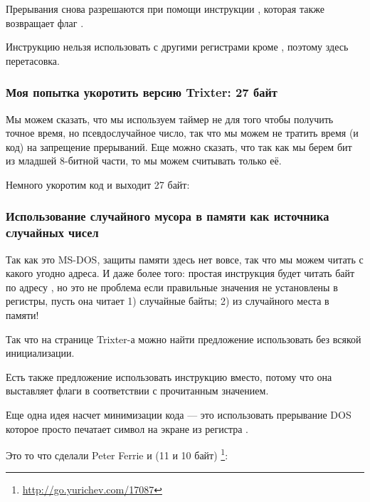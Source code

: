 Прерывания снова разрешаются при помощи инструкции , которая
также возвращает флаг .

Инструкцию  нельзя использовать с другими регистрами кроме , поэтому здесь перетасовка.

\subsubsection{Моя попытка укоротить версию Trixter: 27 байт}

Мы можем сказать, что мы используем таймер не для того чтобы получить точное время, но псевдослучайное число,
так что мы можем не тратить время (и код) на запрещение прерываний.
Еще можно сказать, что так как мы берем бит из младшей 8-битной части, то мы можем считывать только её.

Немного укоротим код и выходит 27 байт:



\subsubsection{Использование случайного мусора в памяти как источника случайных чисел}

Так как это MS-DOS, защиты памяти здесь нет вовсе, так что мы можем читать с какого
угодно адреса.
И даже более того: простая инструкция  
будет читать байт по адресу , но это не проблема
если правильные значения не установлены в регистры, пусть она читает 1) случайные байты; 2) из случайного
места в памяти!

Так что на странице Trixter-а\FNURLTRIXTER 
можно найти предложение использовать  без всякой инициализации.

Есть также предложение использовать инструкцию  
вместо, потому что она выставляет флаги в соответствии с прочитанным значением.

Еще одна идея насчет минимизации кода --- это использовать прерывание DOS
  которое просто печатает символ на экране
из регистра .

Это то что сделали Peter Ferrie и \HERMIT{} (11 и 10 байт)
\footnote{\url{http://go.yurichev.com/17087}}:



